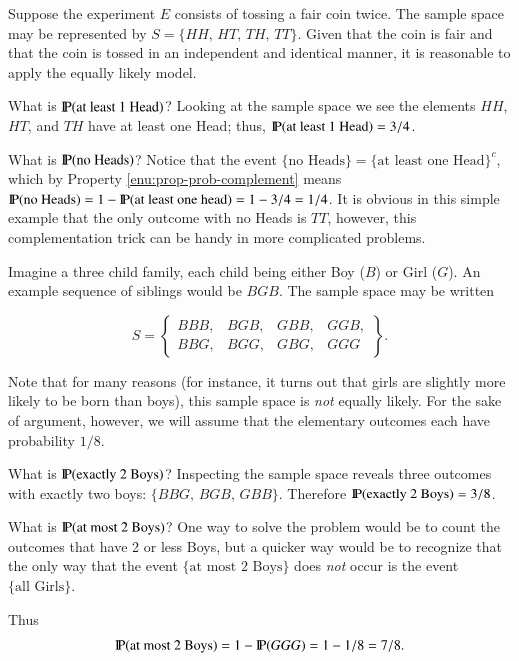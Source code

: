 \documentclass[captions=tableheading]{scrbook}
\begin{document}
\begin{example}
Suppose the experiment \(E\) consists of tossing a fair coin twice. The sample space may be represented by \(S=\{HH,\, HT,\, TH,\, TT\}\). Given that the coin is fair and that the coin is tossed in an independent and identical manner, it is reasonable to apply the equally likely model. 

What is \(\P(\mbox{at least 1 Head})\)? Looking at the sample space we see the elements \(HH\), \(HT\), and \(TH\) have at least one Head; thus, \(\P(\mbox{at least 1 Head})=3/4\). 

What is \(\P(\mbox{no Heads})\)? Notice that the event \(\{ \mbox{no Heads} \} = \{ \mbox{at least one Head} \} ^{c}\), which by Property \ref{enu:prop-prob-complement} means \(\P(\mbox{no Heads})=1-\P(\mbox{at least one head})=1-3/4=1/4\). It is obvious in this simple example that the only outcome with no Heads is \(TT\), however, this complementation trick can be handy in more complicated problems.
\end{example}

\begin{example}
\label{exa:three-child-family}
Imagine a three child family, each child being either Boy (\(B\)) or Girl (\(G\)). An example sequence of siblings would be \(BGB\). The sample space may be written

\[
S=\left\{ 
\begin{array}{cccc}
BBB, & BGB, & GBB, & GGB,\\
BBG, & BGG, & GBG, & GGG
\end{array}
\right\}.
\]

Note that for many reasons (for instance, it turns out that girls are slightly more likely to be born than boys), this sample space is \emph{not} equally likely. For the sake of argument, however, we will assume that the elementary outcomes each have probability \(1/8\).

What is \(\P(\mbox{exactly 2 Boys})\)? Inspecting the sample space reveals three outcomes with exactly two boys: \( \{ BBG,\, BGB,\, GBB \} \).  Therefore \(\P(\mbox{exactly 2 Boys})=3/8\). 

What is \(\P(\mbox{at most 2 Boys})\)? One way to solve the problem would be to count the outcomes that have 2 or less Boys, but a quicker way would be to recognize that the only way that the event \(\{ \mbox{at most 2 Boys} \}\) does \emph{not} occur is the event \(\{ \mbox{all Girls} \}\).

Thus
\[
\P(\mbox{at most 2 Boys})=1-\P(GGG)=1-1/8=7/8.
\]

\end{example}
\end{document}
